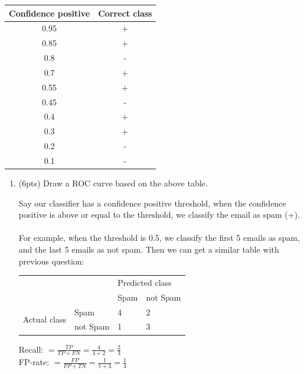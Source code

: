 \documentclass[a4paper]{article}
\theoremstyle{definition}
\newenvironment{soln}{
    \leavevmode\color{blue}\ignorespaces
}{}
\begin{document}
\begin{enumerate}
	      \begin{center}
		      \begin{tabular}{ c  c }
			      \hline
			      Confidence positive & Correct class \\ \hline
			      0.95                & +             \\
			      0.85                & +             \\
			      0.8                 & -             \\
			      0.7                 & +             \\
			      0.55                & +             \\
			      0.45                & -             \\
			      0.4                 & +             \\
			      0.3                 & +             \\
			      0.2                 & -             \\
			      0.1                 & -             \\
			      \hline
		      \end{tabular}
	      \end{center}

	      \begin{enumerate}
		      \item (6pts) Draw a ROC curve based on the above table.

		            \begin{soln}
			            Say our classifier has a confidence positive threshold, when the confidence positive is above or equal to the threshold, we classify the email as spam (+). \\\\
			            For example, when the threshold is 0.5, we classify the first 5 emails as spam, and the last 5 emails as not spam. Then we can get a similar table with previous question: \\
			            \begin{center}
				            \begin{tabular}{l l | l l}
					                                          &          & \multicolumn{2}{l}{Predicted class}            \\
					                                          &          & Spam                                & not Spam \\
					            \hline
					            \multirow{2}{*}{Actual class} & Spam     & 4                                   & 2        \\
					                                          & not Spam & 1                                   & 3
				            \end{tabular}
			            \end{center}
			            Recall: $= \frac{TP}{TP + FN} = \frac{4}{4 + 2} = \frac{2}{3}$ \\
			            FP-rate: $= \frac{FP}{FP + TN} = \frac{1}{1 + 3} = \frac{1}{4}$ \\


\end{soln}
\end{enumerate}
\end{enumerate}
\end{document}
